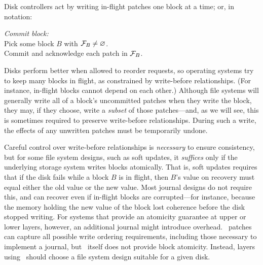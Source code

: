 Disk controllers act by writing in-flight patches one block at a time; or,
 in notation:

\begin{tabbing}
\qquad \textit{Commit block:} \\
\qquad \quad Pick some block $B$ with $\PInf[B] \neq \emptyset$. \\
\qquad \quad Commit and acknowledge each patch in $\PInf[B]$.
\end{tabbing}

\noindent
%
Disks perform better when allowed to reorder requests, so operating systems
 try to keep many blocks in flight, as constrained by write-before
 relationships.  (For instance, in-flight blocks cannot depend on each
 other.)
%
Although file systems will generally write all of a block's uncommitted
 patches when they write the block, they may, if they choose, write a
 \emph{subset} of those patches---and, as we will see, this is sometimes
 required to preserve write-before relationships.
%
During such a write, the effects of any unwritten patches must be
 temporarily undone.


Careful control over write-before relationships is \emph{necessary} to
 ensure consistency, but for some file system designs, such as soft
 updates, it \emph{suffices} only if the underlying storage system
 writes blocks atomically.
%
That is, soft updates requires that if the disk fails while a block $B$ is
 in flight, then $B$'s value on recovery must equal either the old value or
 the new value.
%
Most journal designs do not require this, and can recover even if
 in-flight blocks are corrupted---for instance, because the memory holding
 the new value of the block lost coherence before the disk stopped
 writing.
%
For systems that provide an atomicity guarantee at upper or lower layers,
 however, an additional journal might introduce overhead.
%
\Kudos\ patches can capture all possible write ordering requirements,
 including those necessary to implement a journal, but \Kudos\ itself does
 not provide block atomicity.
%
Instead, layers using \Kudos\ should choose a file system design suitable
 for a given disk.


\begin{comment}
This model does not completely define the disk's behavior on system crash,
 in particular with respect to in-flight blocks.
%
%
Most journal designs do not rely on this assumption, and can recover
 properly even if in-flight blocks are corrupted---for instance,
 because the memory holding the new value of the block lost its coherence
 before the disk stopped writing~\cite{nightingale06rethink}.
%
However, some disks may actually provide an atomicity guarantee, for
 instance by using non-volatile memory to store blocks before they make it
 onto disk.
%
The \Kudos\ core makes no assumptions about block atomicity, instead relying
 on software above it to implement a consistency protocol that makes sense
 for the given disk.
\end{comment}


